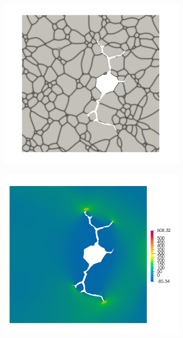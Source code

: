 \begin{frame}
\begin{columns}[T]
\begin{column}{0.4\textwidth}
\begin{figure}
        \begin{subfigure}[t]{0.47\linewidth}
          \centering
          \includegraphics[width=0.9\linewidth,scale=0.3]{Chapter345/figures/partial_hbs_3}
        \end{subfigure}
        \begin{subfigure}[t]{0.47\linewidth}
          \centering
          \includegraphics[width=0.9\linewidth,scale=0.3]{Chapter345/figures/partial_hbs_3_stress}
        \end{subfigure}
      \end{figure}

\end{column}
\end{columns}
\end{frame}
